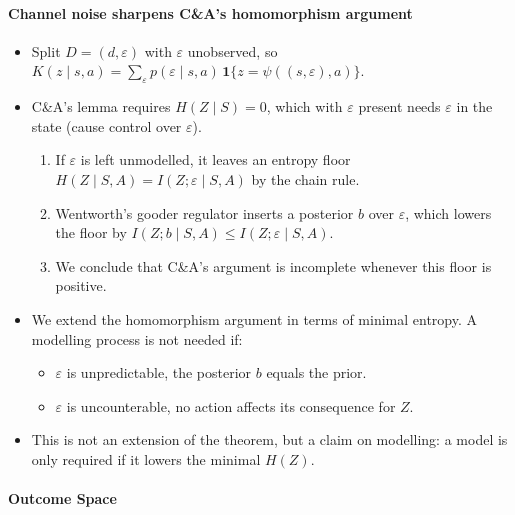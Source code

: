 \documentclass[10pt]{article}
\begin{document}
\paragraph{Channel noise sharpens C\&A's homomorphism argument}
\begin{itemize}
  \item Split $D = (d,\varepsilon)$ with $\varepsilon$ unobserved, so $K(z \mid s,a) = \sum_\varepsilon p(\varepsilon \mid s,a)\,\mathbf 1\{z = \psi((s,\varepsilon),a)\}$.
  \item C\&A's lemma requires $H(Z \mid S) = 0$, which with $\varepsilon$ present needs $\varepsilon$ in the state (cause control over $\varepsilon$).
  \begin{enumerate}
    \item If $\varepsilon$ is left unmodelled, it leaves an entropy floor $H(Z \mid S,A) = I(Z;\varepsilon \mid S,A)$ by the chain rule.
    \item Wentworth's gooder regulator inserts a posterior $b$ over $\varepsilon$, which lowers the floor by $I(Z;b \mid S,A) \le I(Z;\varepsilon \mid S,A)$.
  \item We conclude that C\&A's argument is incomplete whenever this floor is positive.
  \end{enumerate}
  \item We extend the homomorphism argument in terms of minimal entropy. A modelling process is not needed if:
  \begin{itemize}
    \item $\varepsilon$ is unpredictable, the posterior $b$ equals the prior.
    \item $\varepsilon$ is uncounterable, no action affects its consequence for $Z$.
  \end{itemize}
  \item This is not an extension of the theorem, but a claim on modelling: a model is only required if it lowers the minimal $H(Z)$.
\end{itemize}



\paragraph{Outcome Space}
\end{document}

